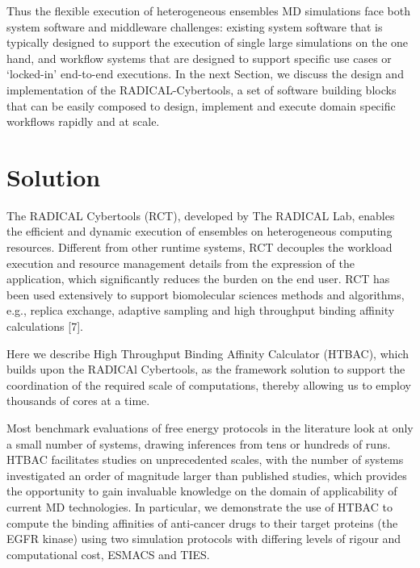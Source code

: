 \documentclass[conference]{IEEEtran}
\begin{document}

Thus the flexible execution of heterogeneous ensembles MD simulations face
both system software and middleware challenges: existing system software that
is typically designed to support the execution of single large simulations on
the one hand, and workflow systems that are designed to support specific use
cases or `locked-in' end-to-end executions. In the next Section, we discuss
the design and implementation of the RADICAL-Cybertools, a set of software
building blocks that can be easily composed to design, implement and execute
domain specific workflows rapidly and at scale.

\section{Solution}\label{sec:solution}

The RADICAL Cybertools (RCT), developed by The RADICAL Lab, enables the 
efficient and dynamic execution of ensembles on heterogeneous computing 
resources. Different from other runtime systems, RCT decouples the workload 
execution and resource management details from the expression of the 
application, which significantly reduces the burden on the end user. 
RCT has been used extensively to support 
biomolecular sciences methods and algorithms, e.g., replica exchange, adaptive
sampling and high throughput binding affinity calculations [7]. 

Here we describe High Throughput Binding Affinity Calculator (HTBAC), 
which builds upon the RADICAl Cybertools, as the framework solution to support 
the coordination of the required scale of computations, thereby 
allowing us to employ thousands of cores at a time.

Most benchmark evaluations of free energy protocols in the literature look 
at only a small number of systems, drawing inferences from tens or hundreds 
of runs. HTBAC facilitates studies on unprecedented scales, with the number 
of systems investigated an order of magnitude larger than published studies, 
which provides the opportunity to gain invaluable knowledge on the domain of 
applicability of current MD technologies. In particular, we demonstrate the 
use of HTBAC to compute the binding affinities of anti-cancer drugs to their 
target proteins (the EGFR kinase) using two simulation protocols with differing 
levels of rigour and computational cost, ESMACS and TIES.
\end{document}
